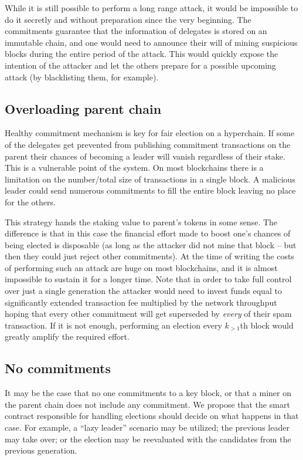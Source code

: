 While it is still possible to perform a long range attack, it would be
impossible to do it secretly and without preparation since the very beginning.
The commitments guarantee that the information of delegates is stored on an
immutable chain, and one would need to announce their will of mining suspicious
blocks during the entire period of the attack. This would quickly expose the
intention of the attacker and let the others prepare for a possible upcoming
attack (by blacklisting them, for example).

\subsection{Overloading parent chain}

Healthy commitment mechanism is key for fair election on a hyperchain. If some
of the delegates get prevented from publishing commitment transactions on the
parent their chances of becoming a leader will vanish regardless of their stake.
This is a vulnerable point of the system. On most blockchains there is a
limitation on the number/total size of transactions in a single block. A
malicious leader could send numerous commitments to fill the entire block
leaving no place for the others.

This strategy hands the staking value to parent's tokens in some sense. The
difference is that in this case the financial effort made to boost one's chances
of being elected is disposable (as long as the attacker did not mine that block
– but then they could just reject other commitments). At the time of writing the
costs of performing such an attack are huge on most blockchains, and it is
almost impossible to sustain it for a longer time. Note that in order to take
full control over just a single generation the attacker would need to invest
funds equal to significantly extended transaction fee multiplied by the network
throughput hoping that every other commitment will get superseded by
\textit{every} of their spam transaction. If it is not enough, performing an
election every $k_{> 1}$th block would greatly amplify the required effort.

\subsection{No commitments}

It may be the case that no one commitments to a key block, or that a miner on
the parent chain does not include any commitment. We propose that the smart
contract responsible for handling elections should decide on what happens in
that case. For example, a ``lazy leader'' scenario may be utilized; the
previous leader may take over; or the election may be reevaluated with the
candidates from the previous generation.
